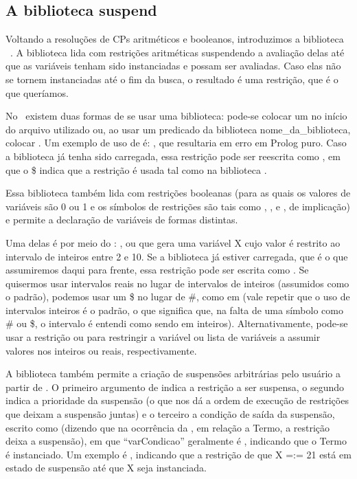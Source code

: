 \subsection{A biblioteca suspend}

Voltando a resoluções de CPs aritméticos e booleanos, introduzimos a biblioteca \eclipse\ . A biblioteca  lida com restrições aritméticas suspendendo a avaliação delas até que as variáveis tenham sido instanciadas e possam ser avaliadas. Caso elas não se tornem instanciadas até o fim da busca, o resultado é uma restrição, que é o que queríamos.

No \eclipse\ existem duas formas de se usar uma biblioteca: pode-se colocar um  no início do arquivo utilizado ou, ao usar um predicado da biblioteca nome\_da\_biblioteca, colocar . Um exemplo de uso de  é: , que resultaria em erro em Prolog puro. Caso a biblioteca  já tenha sido carregada, essa restrição pode ser reescrita como ,
em que o \$ indica que a restrição é usada tal como na biblioteca .

Essa biblioteca também lida com restrições booleanas (para as quais os valores de variáveis são 0 ou
1 e os símbolos de restrições são tais como , ,  e
, de implicação) e permite a declaração de variáveis de formas distintas.

Uma delas é por meio do : , ou 
que gera uma variável X cujo valor é restrito ao intervalo de inteiros entre 2 e 10. Se a biblioteca já estiver carregada, que é o que assumiremos daqui para frente, essa restrição pode ser escrita como .
Se quisermos usar intervalos reais no lugar de intervalos de inteiros (assumidos como o padrão),
podemos usar um \$ no lugar de \#, como em  (vale repetir que o uso de
intervalos inteiros é o padrão, o que significa que, na falta de uma símbolo como  \# ou \$, o
intervalo é entendi como sendo em inteiros).
Alternativamente, pode-se usar a restrição  ou  para restringir a variável ou lista de variáveis a assumir valores nos inteiros ou reais, respectivamente.



A biblioteca  também permite a criação de suspensões arbitrárias pelo usuário a
partir de . O primeiro argumento de  indica a restrição a ser
suspensa, o segundo indica a prioridade da suspensão (o que nos dá a ordem de execução de restrições
que deixam a suspensão juntas) e o terceiro a condição de saída da suspensão, escrito como
 (dizendo que na ocorrência da , em relação a Termo, a restrição deixa a suspensão), em que
``var{Condicao}'' geralmente é , indicando que o Termo é instanciado.
Um exemplo é , indicando que a restrição de que X =:= 21 está em estado de suspensão até que X seja instanciada.

